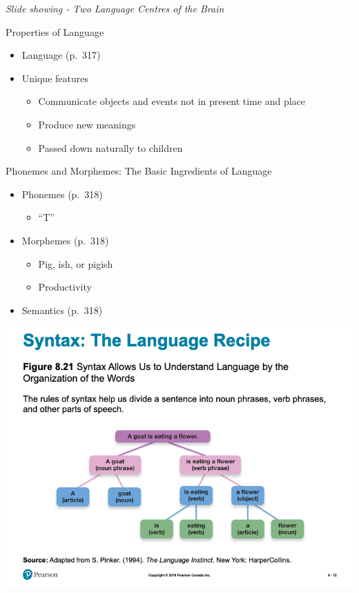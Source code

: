 \documentclass[
]{book}
\providecommand{\tightlist}{%
  \setlength{\itemsep}{0pt}\setlength{\parskip}{0pt}}
\begin{document}
\begin{reflect}
\emph{Slide showing - Two Language Centres of the Brain}

Properties of Language

\begin{itemize}
\tightlist
\item
  Language (p.~317)\\
\item
  Unique features

  \begin{itemize}
  \tightlist
  \item
    Communicate objects and events not in present time and place\\
  \item
    Produce new meanings\\
  \item
    Passed down naturally to children
  \end{itemize}
\end{itemize}

Phonemes and Morphemes: The Basic Ingredients of Language

\begin{itemize}
\tightlist
\item
  Phonemes (p.~318)

  \begin{itemize}
  \tightlist
  \item
    ``T''
  \end{itemize}
\item
  Morphemes (p.~318)

  \begin{itemize}
  \tightlist
  \item
    Pig, ish, or pigish\\
  \item
    Productivity\\
  \end{itemize}
\item
  Semantics (p.~318)
\end{itemize}

\includegraphics{assets/unit_1/slide_72.png}


\end{reflect}
\end{document}

